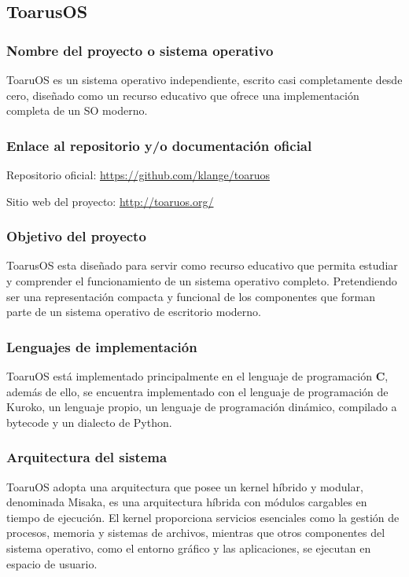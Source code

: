 
\subsection{ToarusOS}
\subsubsection{Nombre del proyecto o sistema operativo}
ToaruOS es un sistema operativo independiente, escrito casi completamente desde cero, diseñado como un recurso educativo que ofrece una implementación completa de un SO moderno.


\subsubsection{Enlace al repositorio y/o documentación oficial}

Repositorio oficial: \url{https://github.com/klange/toaruos}

Sitio web del proyecto: \url{http://toaruos.org/}

\subsubsection{Objetivo del proyecto}
ToarusOS esta diseñado para servir como recurso educativo que permita estudiar y comprender el funcionamiento de un sistema operativo completo. Pretendiendo ser una representación compacta y funcional de los componentes que forman parte de un sistema operativo de escritorio moderno.

\subsubsection{Lenguajes de implementación}
ToaruOS está implementado principalmente en el lenguaje de programación \textbf{C}, además de ello, se encuentra implementado con el lenguaje de programación de Kuroko, un lenguaje propio, un lenguaje de programación dinámico, compilado a bytecode y un dialecto de Python.

\subsubsection{Arquitectura del sistema}
ToaruOS adopta una arquitectura que posee un kernel híbrido y modular, denominada Misaka, es una arquitectura híbrida con módulos cargables en tiempo de ejecución. El kernel proporciona servicios esenciales como la gestión de procesos, memoria y sistemas de archivos, mientras que otros componentes del sistema operativo, como el entorno gráfico y las aplicaciones, se ejecutan en espacio de usuario.

